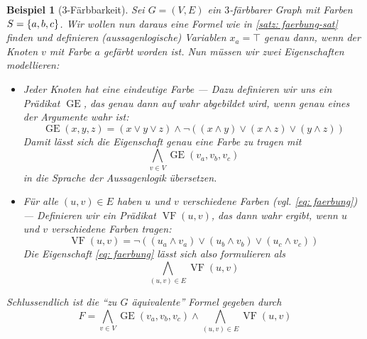 \documentclass[ngerman, a4paper, 12pt]{article}
\newcounter{themcount}
\theoremstyle{plain}
\newtheorem{beispiel}[themcount]{Beispiel}
\theoremstyle{break}
\theoremstyle{proofstyle}
\DeclareMathOperator{\GE}{GE}
\DeclareMathOperator{\VF}{VF}
\begin{document}
	\begin{beispiel}[$3$-Färbbarkeit]
		Sei $G = (V,E)$ ein $3$-färbbarer Graph mit Farben $S = \left\{ a,b,c \right\}$. Wir wollen nun daraus eine Formel wie in \cref{satz: faerbung-sat} finden und definieren (aussagenlogische) Variablen $x_a = \top$ genau dann, wenn der Knoten $v$ mit Farbe $a$ gefärbt worden ist.
		Nun müssen wir zwei Eigenschaften modellieren:
		\begin{itemize}
			\item Jeder Knoten hat eine eindeutige Farbe --- Dazu definieren wir uns ein Prädikat $\GE$, das genau dann auf wahr abgebildet wird, wenn genau eines der Argumente wahr ist:
			\begin{equation*}
				\GE (x,y,z) = (x \lor y \lor z) \land \lnot ((x \land y) \lor (x \land z) \lor (y \land z))
			\end{equation*}
			Damit lässt sich die Eigenschaft genau eine Farbe zu tragen mit
			\begin{equation*}
				\bigwedge_{v \in V} \GE(v_a, v_b, v_c)
			\end{equation*}
			in die Sprache der Aussagenlogik übersetzen.
			\item Für alle $(u,v) \in E$ haben $u$ und $v$ verschiedene Farben (vgl. \eqref{eq: faerbung}) --- Definieren wir ein Prädikat $\VF(u,v)$, das dann wahr ergibt, wenn $u$ und $v$ verschiedene Farben tragen:
			\begin{equation*}
				\VF(u,v) = \lnot ((u_a \land v_a) \lor (u_b \land v_b) \lor (u_c \land v_c))
			\end{equation*}
			Die Eigenschaft \eqref{eq: faerbung} lässt sich also formulieren als
			\begin{equation*}
				\bigwedge_{(u,v) \in E} \VF(u,v)
			\end{equation*}
		\end{itemize}
		Schlussendlich ist die \enquote{zu $G$ äquivalente} Formel gegeben durch
		\begin{equation*}
			F = \bigwedge_{v \in V} \GE(v_a, v_b, v_c) \land \bigwedge_{(u,v) \in E} \VF(u,v)
		\end{equation*}
	\end{beispiel}
	
	\nocite{*}	
	
 
\end{document}
